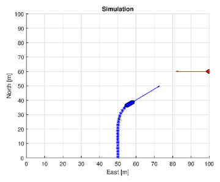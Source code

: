\begin{figure}[!b]
\begin{subfigure}[b]{0.499\textwidth}
        \centering
        \includegraphics[width=\textwidth]{Images/Figures/Enkel_GW/Simple0_f600_Frame3}
    \end{subfigure}
    \hfill
\end{figure}%
